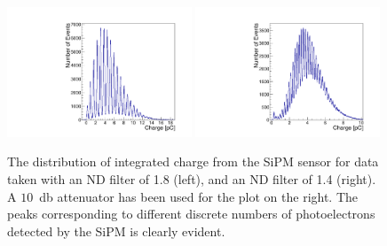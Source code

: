 \begin{figure}[htbp] 
\centering
\includegraphics[width=0.49\textwidth]{figures/NPhotons1.pdf} 
\includegraphics[width=0.49\textwidth]{figures/NPhotons2.pdf} 
\caption{The distribution of integrated charge from the SiPM sensor for data 
taken with an ND filter of 1.8 (left), and an ND filter of 1.4 (right). 
A $10$~db attenuator has been used for the plot on the right. The peaks corresponding
to different discrete numbers of photoelectrons detected by the SiPM is clearly
evident.} 
\label{fig:NPhotonPeaks} 
\end{figure} 

